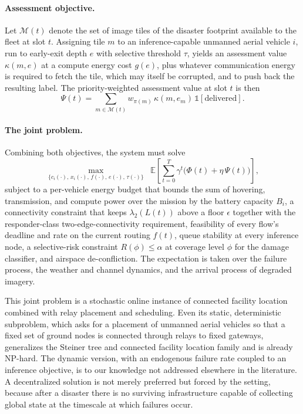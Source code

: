 \documentclass[drones,article,submit,moreauthors]{Definitions/mdpi}
\begin{document}
\paragraph{Assessment objective.} Let $\mathcal{M}(t)$ denote the set of image tiles of the disaster footprint available to the fleet at slot $t$. Assigning tile $m$ to an inference-capable unmanned aerial vehicle $i$, run to early-exit depth $e$ with selective threshold $\tau$, yields an assessment value $\kappa(m, e)$ at a compute energy cost $g(e)$, plus whatever communication energy is required to fetch the tile, which may itself be corrupted, and to push back the resulting label. The priority-weighted assessment value at slot $t$ is then
\begin{equation}
\Psi(t) = \sum_{m \in \mathcal{M}(t)} w_{\pi(m)}\, \kappa(m, e_m)\, \mathbb{1}[\text{delivered}].
\end{equation}

\paragraph{The joint problem.} Combining both objectives, the system must solve
\begin{equation}
\max_{\{c_i(\cdot),\, x_i(\cdot),\, f(\cdot),\, e(\cdot),\, \tau(\cdot)\}} \;\; \mathbb{E}\left[ \sum_{t=0}^{T} \gamma^t \big( \Phi(t) + \eta\, \Psi(t) \big) \right],
\end{equation}
subject to a per-vehicle energy budget that bounds the sum of hovering, transmission, and compute power over the mission by the battery capacity $B_i$, a connectivity constraint that keeps $\lambda_2(L(t))$ above a floor $\epsilon$ together with the responder-class two-edge-connectivity requirement, feasibility of every flow's deadline and rate on the current routing $f(t)$, queue stability at every inference node, a selective-risk constraint $R(\phi) \le \alpha$ at coverage level $\phi$ for the damage classifier, and airspace de-confliction. The expectation is taken over the failure process, the weather and channel dynamics, and the arrival process of degraded imagery.

This joint problem is a stochastic online instance of connected facility location combined with relay placement and scheduling. Even its static, deterministic subproblem, which asks for a placement of unmanned aerial vehicles so that a fixed set of ground nodes is connected through relays to fixed gateways, generalizes the Steiner tree and connected facility location family and is already \mbox{NP-hard}. The dynamic version, with an endogenous failure rate coupled to an inference objective, is to our knowledge not addressed elsewhere in the literature. A decentralized solution is not merely preferred but forced by the setting, because after a disaster there is no surviving infrastructure capable of collecting global state at the timescale at which failures occur.
\end{document}
